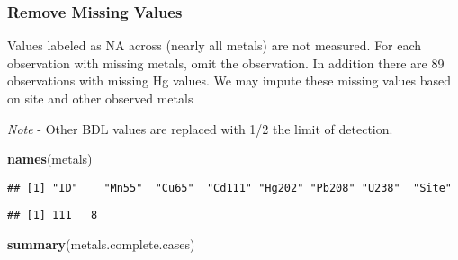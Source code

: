 \documentclass[]{article}
\newenvironment{Shaded}{\begin{snugshade}}{\end{snugshade}}
\newcommand{\CommentTok}[1]{\textcolor[rgb]{0.56,0.35,0.01}{\textit{#1}}}
\newcommand{\DecValTok}[1]{\textcolor[rgb]{0.00,0.00,0.81}{#1}}
\newcommand{\KeywordTok}[1]{\textcolor[rgb]{0.13,0.29,0.53}{\textbf{#1}}}
\newcommand{\NormalTok}[1]{#1}
\newcommand{\OperatorTok}[1]{\textcolor[rgb]{0.81,0.36,0.00}{\textbf{#1}}}
\newcommand{\StringTok}[1]{\textcolor[rgb]{0.31,0.60,0.02}{#1}}
\begin{document}
\hypertarget{remove-missing-values}{%
\subsubsection{Remove Missing Values}\label{remove-missing-values}}

Values labeled as NA across (nearly all metals) are not measured. For
each observation with missing metals, omit the observation. In addition
there are 89 observations with missing Hg values. We may impute these
missing values based on site and other observed metals

\emph{Note} - Other BDL values are replaced with 1/2 the limit of
detection.

\begin{Shaded}
\begin{Highlighting}[]
\KeywordTok{names}\NormalTok{(metals)}
\end{Highlighting}
\end{Shaded}

\begin{verbatim}
## [1] "ID"    "Mn55"  "Cu65"  "Cd111" "Hg202" "Pb208" "U238"  "Site"
\end{verbatim}

\begin{Shaded}
\end{Shaded}

\begin{verbatim}
## [1] 111   8
\end{verbatim}

\begin{Shaded}
\begin{Highlighting}[]
\KeywordTok{summary}\NormalTok{(metals.complete.cases)}
\end{Highlighting}
\end{Shaded}
\end{document}
